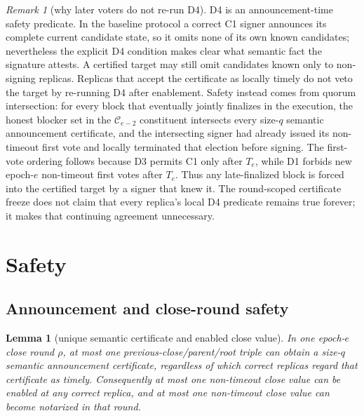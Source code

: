 \documentclass[11pt]{article}
\newtheorem{lemma}[theorem]{Lemma}
\theoremstyle{definition}
\theoremstyle{remark}
\newtheorem{remark}[theorem]{Remark}
\newcommand{\C}{\mathcal C}
\begin{document}
\begin{remark}[why later voters do not re-run D4]
D4 is an announcement-time safety predicate. In the baseline protocol a correct C1 signer announces its complete current candidate state, so it omits none of its own known candidates; nevertheless the explicit D4 condition makes clear what semantic fact the signature attests. A certified target may still omit candidates known only to non-signing replicas. Replicas that accept the certificate as locally timely do not veto the target by re-running D4 after enablement. Safety instead comes from quorum intersection: for every block that eventually jointly finalizes in the execution, the honest blocker set in the $\C_{e-2}$ constituent intersects every size-$q$ semantic announcement certificate, and the intersecting signer had already issued its non-timeout first vote and locally terminated that election before signing. The first-vote ordering follows because D3 permits C1 only after $T_e$, while D1 forbids new epoch-$e$ non-timeout first votes after $T_e$. Thus any late-finalized block is forced into the certified target by a signer that knew it. The round-scoped certificate freeze does not claim that every replica's local D4 predicate remains true forever; it makes that continuing agreement unnecessary.
\end{remark}

\section{Safety}

\subsection{Announcement and close-round safety}

\begin{lemma}[unique semantic certificate and enabled close value]
\label{lem:announce-unique}
In one epoch-$e$ close round $\rho$, at most one previous-close/parent/root triple can obtain a size-$q$ semantic announcement certificate, regardless of which correct replicas regard that certificate as timely. Consequently at most one non-timeout close value can be enabled at any correct replica, and at most one non-timeout close value can become notarized in that round.
\end{lemma}
\end{document}
